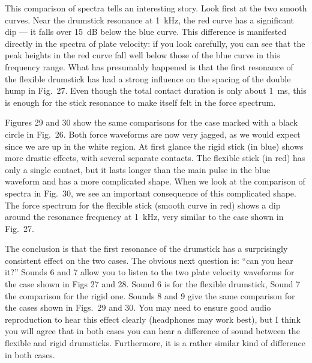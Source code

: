  This comparison of spectra tells an interesting story. Look first at the two 
  smooth curves. Near the drumstick resonance at 1~kHz, the red curve has a 
  significant dip — it falls over 15~dB below the blue curve. This difference 
  is manifested directly in the spectra of plate velocity: if you look 
  carefully, you can see that the peak heights in the red curve fall well below 
  those of the blue curve in this frequency range. What has presumably happened 
  is that the first resonance of the flexible drumstick has had a strong 
  influence on the spacing of the double hump in Fig.\ 27. Even though the 
  total contact duration is only about 1~ms, this is enough for the stick 
  resonance to make itself felt in the force spectrum. 

  Figures 29 and 30 show the same comparisons for the case marked with a black 
  circle in Fig.\ 26. Both force waveforms are now very jagged, as we would 
  expect since we are up in the white region. At first glance the rigid stick 
  (in blue) shows more drastic effects, with several separate contacts. The 
  flexible stick (in red) has only a single contact, but it lasts longer than 
  the main pulse in the blue waveform and has a more complicated shape. When we 
  look at the comparison of spectra in Fig.\ 30, we see an important 
  consequence of this complicated shape. The force spectrum for the flexible 
  stick (smooth curve in red) shows a dip around the resonance frequency at 
  1~kHz, very similar to the case shown in Fig.\ 27. 



  The conclusion is that the first resonance of the drumstick has a 
  surprisingly consistent effect on the two cases. The obvious next question 
  is: “can you hear it?” Sounds 6 and 7 allow you to listen to the two plate 
  velocity waveforms for the case shown in Figs 27 and 28. Sound 6 is for the 
  flexible drumstick, Sound 7 the comparison for the rigid one. Sounds 8 and 9 
  give the same comparison for the cases shown in Figs.\ 29 and 30. You may 
  need to ensure good audio reproduction to hear this effect clearly 
  (headphones may work best), but I think you will agree that in both cases you 
  can hear a difference of sound between the flexible and rigid drumsticks. 
  Furthermore, it is a rather similar kind of difference in both cases. 

